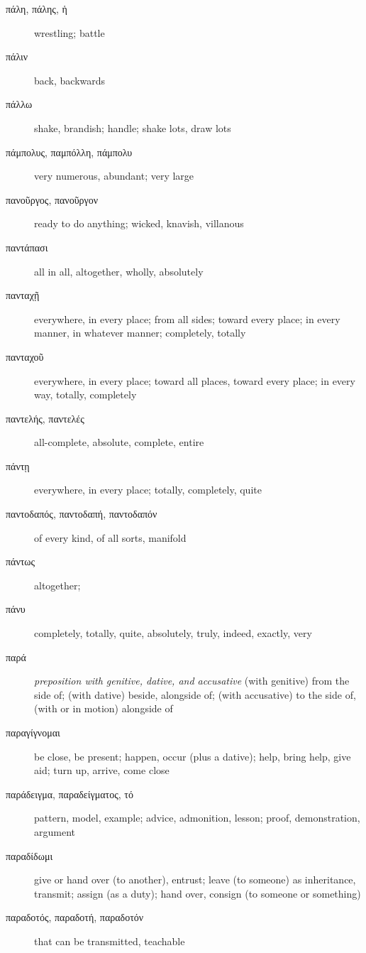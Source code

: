 \documentclass[12pt,letterpaper]{article}
\begin{document}
\begin{description}
    \item[\textgreek{πάλη, πάλης, ἡ}] wrestling; battle
    \item[\textgreek{πάλιν}] \marginnote{*}back, backwards
    \item[\textgreek{πάλλω}] shake, brandish; handle; shake lots, draw lots
    \item[\textgreek{πάμπολυς, παμπόλλη, πάμπολυ}] very numerous, abundant; very large
    \item[\textgreek{πανοῦργος, πανοῦργον}] ready to do anything; wicked, knavish, villanous
    \item[\textgreek{παντάπασι}] all in all, altogether, wholly, absolutely
    \item[\textgreek{πανταχῇ}] everywhere, in every place; from all sides; toward every place; in every manner, in whatever manner; completely, totally
    \item[\textgreek{πανταχοῦ}] everywhere, in every place; toward all places, toward every place; in every way, totally, completely
    \item[\textgreek{παντελής, παντελές}] all-complete, absolute, complete, entire
    \item[\textgreek{πάντῃ}] everywhere, in every place; totally, completely, quite
    \item[\textgreek{παντοδαπός, παντοδαπή, παντοδαπόν}] of every kind, of all sorts, manifold
    \item[\textgreek{πάντως}] \marginnote{*}altogether;
    \item[\textgreek{πάνυ}] \marginnote{*}completely, totally, quite, absolutely, truly, indeed, exactly, very
    \item[\textgreek{παρά}] \marginnote{*}\textit{preposition with genitive, dative, and accusative} (with genitive) from the side of; (with dative) beside, alongside of; (with accusative) to the side of, (with or in motion) alongside of
    \item[\textgreek{παραγίγνομαι}] be close, be present; happen, occur (plus a dative); help, bring help, give aid; turn up, arrive, come close
    \item[\textgreek{παράδειγμα, παραδείγματος, τό}] pattern, model, example; advice, admonition, lesson; proof, demonstration, argument
    \item[\textgreek{παραδίδωμι}] give or hand over (to another), entrust; leave (to someone) as inheritance, transmit; assign (as a duty); hand over, consign (to someone or something)
    \item[\textgreek{παραδοτός, παραδοτή, παραδοτόν}] that can be transmitted, teachable

\end{description}
\end{document}
